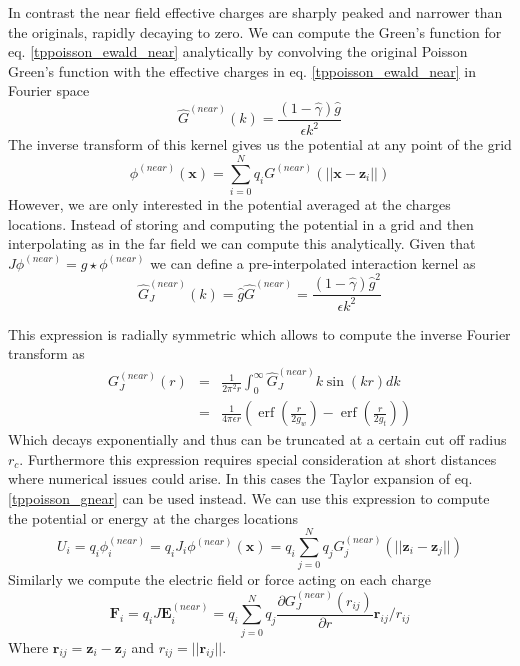\documentclass[ twoside,openright,titlepage,numbers=noenddot,%
headinclude,footinclude,cleardoublepage=empty,abstract=on,
BCOR=5mm,paper=a4,fontsize=11pt, dvipsnames
]{scrreprt}
\renewcommand{\vec}[1]{\bm{#1}}
\DeclareMathOperator{\erf}{erf}
\begin{document}
In contrast the near field effective charges are sharply peaked and narrower than the originals, rapidly decaying to zero. We can compute the Green's function for eq. \eqref{tppoisson_ewald_near} analytically by convolving the original Poisson Green's function with the effective charges in eq. \eqref{tppoisson_ewald_near} in Fourier space
\begin{equation}
  \hat{G}^{(near)}(k) = \frac{(1-\hat{\gamma})\hat{g}}{\epsilon k^2}
\end{equation}
The inverse transform of this kernel gives us the potential at any point of the grid 
\begin{equation}
  \phi^{(near)}(\vec{x}) = \sum_{i=0}^N{q_iG^{(near)}(||\vec{x}-\vec{z}_i||)}
\end{equation}
However, we are only interested in the potential averaged at the charges locations. Instead of storing and computing the potential in a grid and then interpolating as in the far field we can compute this analytically. Given that $J \phi^{(near)} = g\star \phi^{(near)}$ we can define a pre-interpolated interaction kernel as
\begin{equation}
  \hat{G}_J^{(near)}(k) = \hat{g}\hat{G}^{(near)} = \frac{(1-\hat{\gamma})\hat{g}^2}{\epsilon k^2}
\end{equation}

This expression is radially symmetric which allows to compute the inverse Fourier transform as
\begin{eqnarray}
  \label{tppoisson_gnear}
  G_J^{(near)}(r) &=& \frac{1}{2\pi^2r}\int_0^\infty{\hat{G}^{(near)}_Jk \sin(kr)dk}\nonumber \\
            &=& \frac{1}{4\pi\epsilon r}\left(\erf\left(\frac{r}{2g_w}\right) - \erf\left(\frac{r}{2g_t}\right)\right)
\end{eqnarray}
Which decays exponentially and thus can be truncated at a certain cut off radius $r_c$. Furthermore this expression requires special consideration at short distances where numerical issues could arise. In this cases the Taylor expansion of eq. \eqref{tppoisson_gnear} can be used instead.
We can use this expression to compute the potential or energy at the charges locations
\begin{equation}
  U_i = q_i\phi^{(near)}_i = q_iJ_i\phi^{(near)}(\vec{x}) = q_i\sum_{j=0}^N{q_jG_j^{(near)}(||\vec{z}_i - \vec{z}_j||)}
\end{equation}
Similarly we compute the electric field or force acting on each charge 
\begin{equation}
  \vec{F}_i = q_i J \vec{E}^{(near)}_i = q_i\sum_{j=0}^N{q_j\frac{\partial G_J^{(near)}(r_{ij})}{\partial r}\vec{r}_{ij}/r_{ij}}
\end{equation}
Where $\vec{r}_{ij} = \vec{z}_i - \vec{z}_j$ and $r_{ij} = ||\vec{r}_{ij}||$.
\end{document}
